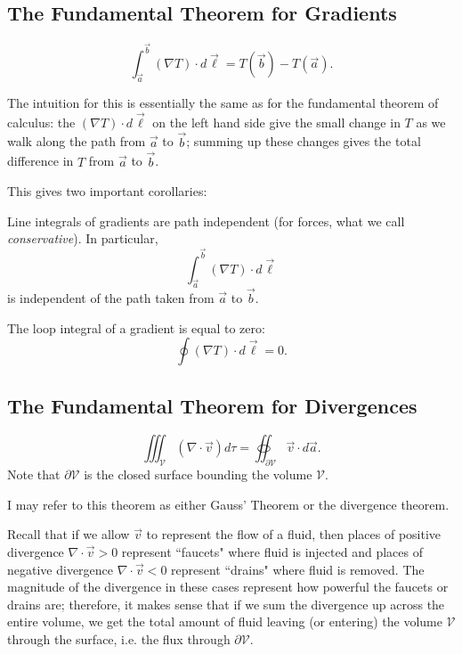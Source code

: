 \subsection{The Fundamental Theorem for Gradients}

\begin{theorem}
\[\int_{\vec{a}}^{\vec{b}}(\nabla T)\cdot d\vec{\ell}=T(\vec{b})-T(\vec{a}).\]
\end{theorem}

The intuition for this is essentially the same as for the fundamental theorem of calculus: the $(\nabla T)\cdot d\vec{\ell}$ on the left hand side give the small change in $T$ as we walk along the path from $\vec{a}$ to $\vec{b}$; summing up these changes gives the total difference in $T$ from $\vec{a}$ to $\vec{b}$.

This gives two important corollaries:

\begin{corollary}
    Line integrals of gradients are path independent (for forces, what we call \textit{conservative}). In particular,
    \[\int_{\vec{a}}^{\vec{b}}(\nabla T)\cdot d\vec{\ell}\]
    is independent of the path taken from $\vec{a}$ to $\vec{b}$.
\end{corollary}

\begin{corollary}
    The loop integral of a gradient is equal to zero:
    \[\oint (\nabla T)\cdot d\vec{\ell}=0.\]
\end{corollary}

\subsection{The Fundamental Theorem for Divergences}

\begin{theorem}
    \[\iiint_{\mathcal{V}}(\nabla\cdot \vec{v})d\tau=\oiint_{\partial\mathcal{V}}\vec{v}\cdot d\vec{a}.\]
    Note that $\partial\mathcal{V}$ is the closed surface bounding the volume $\mathcal{V}$.
\end{theorem}

I may refer to this theorem as either Gauss' Theorem or the divergence theorem.

Recall that if we allow $\vec{v}$ to represent the flow of a fluid, then places of positive divergence $\nabla\cdot\vec{v}>0$ represent ``faucets" where fluid is injected and places of negative divergence $\nabla\cdot\vec{v}<0$ represent ``drains" where fluid is removed. The magnitude of the divergence in these cases represent how powerful the faucets or drains are; therefore, it makes sense that if we sum the divergence up across the entire volume, we get the total amount of fluid leaving (or entering) the volume $\mathcal{V}$ through the surface, i.e. the flux through $\partial \mathcal{V}$.

